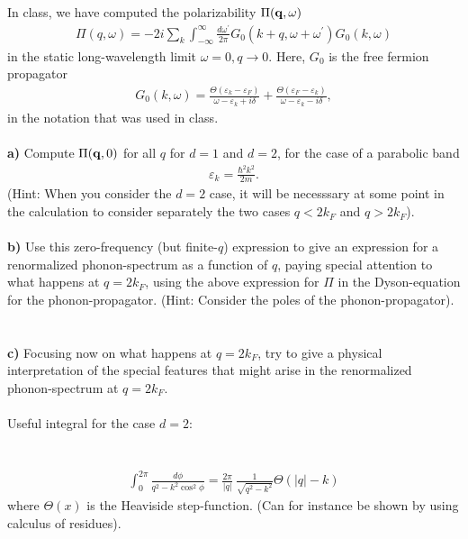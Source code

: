 \begin{problem}
In class, we have computed the polarizability $\Pi({\bf q}, \omega) $
\begin{eqnarray}
	\Pi( q, \omega) = -2 i \sum_k \int_{-\infty}^{\infty} \frac{d \omega^{\prime}}{2 \pi} G_0(k+q,\omega + \omega^{\prime}) G_0(k,\omega) \nonumber 
\end{eqnarray}
in the static long-wavelength limit $\omega=0, q \to 0$. Here, $G_0$ is the free fermion propagator
\begin{eqnarray}
	G_0(k,\omega) = \frac{\Theta(\varepsilon_k-\varepsilon_F)}{\omega - \varepsilon_{k} + i \delta}
	+  \frac{\Theta(\varepsilon_F-\varepsilon_k)}{\omega - \varepsilon_{k} - i \delta}, \nonumber
\end{eqnarray} 
in the notation that was used in class. 
\ \\
\ \\
{\bf a)} Compute $\Pi({\bf q}, 0) $ for all $q$ for $d=1$ and $d=2$, for the case of a parabolic band 
\begin{eqnarray}
	\varepsilon_k = \frac{\hbar^2 k^2}{2m}. \nonumber
\end{eqnarray} 
(Hint: When you consider the $d=2$ case, it will be necesssary at some point in the calculation to consider separately the two cases $q < 2 k_F$ and $q > 2 k_F$). 
\ \\
\ \\
{\bf b)} Use this zero-frequency (but finite-$q$) expression to give an expression for a renormalized phonon-spectrum as a function of $q$, paying special attention to what happens at $q=2 k_F$, using the above expression for $\Pi$ in the Dyson-equation for the phonon-propagator. (Hint: Consider the poles of the phonon-propagator). 
\ \\
\ \\
{\bf c)} Focusing now on what happens at $q=2k_F$, try to give a physical interpretation of the  special features that might arise in the renormalized phonon-spectrum at $q=2 k_F$.    
\ \\
\ \\
Useful integral for the case $d=2$:
\ \\
\ \\
\ \\
\begin{eqnarray}
	\int_0^{2 \pi} \frac{d \phi}{q^2-k^2 \cos^2 \phi} = \frac{2 \pi}{|q|} ~ \frac{1}{\sqrt{q^2-k^2}} \Theta(|q|-k) \nonumber
\end{eqnarray}
where $\Theta(x)$ is the Heaviside step-function. (Can for instance be shown by using calculus of residues).  
\end{problem}